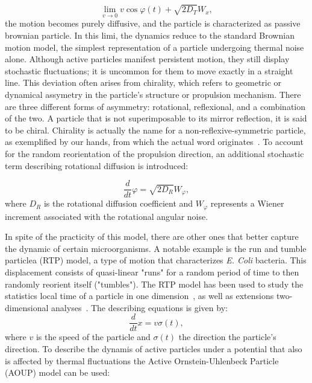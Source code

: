 \begin{equation}
  \lim_{v \to 0}  v\cos{\varphi(t)} + \sqrt{2D_T}W_x,
  \label{eq:limitofvelocity}
\end{equation}
the motion becomes purely diffusive, and the particle is characterized as passive brownian particle. In this limi, the dynamics reduce to the standard Brownian motion model, the simplest representation of a particle undergoing thermal noise alone.
Although active particles manifest persistent motion, they still display stochastic fluctuations; it is uncommon for them to move exactly in a straight line. This deviation often arises from chirality, which refers to geometric or dynamical assymetry in the particle's structure or propulsion mechanism. There are three different forms of asymmetry: rotational, reflexional, and a combination of the two. A particle that is not superimposable to its mirror reflection, it is said to be chiral. Chirality is actually the name for a non-reflexive-symmetric particle, as exemplified by our hands, from which the actual word originates~\cite{cahn1966specification}. To account for the random reorientation of the propulsion direction, an additional stochastic term describing rotational diffusion is introduced:

\begin{equation}
  \frac{d}{dt}{\varphi} = \sqrt{2D_R}W _{\varphi},
  \label{eq:rotationaldiffusion}
\end{equation}
where $D_R$ is the rotational diffusion coefficient and $W_\varphi$ represents a Wiener increment associated with the rotational angular noise.

In spite of the practicity of this model, there are other ones that better capture the dynamic of certain microorganisms. A notable example is the run and tumble particlea (RTP) model, a type of motion that characterizes \textit{E. Coli} bacteria. This displacement consists of quasi-linear "runs" for a random period of time to then randomly reorient itself ("tumbles"). The RTP model has been used to study the statistics local time of a particle in one dimension~\cite{singh2021local}, as well as extensions two-dimensional analyses~\cite{santra2020run}.
The describing equations is given by:
\begin{equation}
  \frac{d}{dt}x = v\sigma (t), 
  \label{eq:runandthumble}
\end{equation}
where $v$ is the speed of the particle and $\sigma (t)$ the direction the particle's direction. 
To describe the dynamis of active particles under a potential that also is affected by thermal fluctuations the Active Ornstein-Uhlenbeck Particle (AOUP) model can be used:

